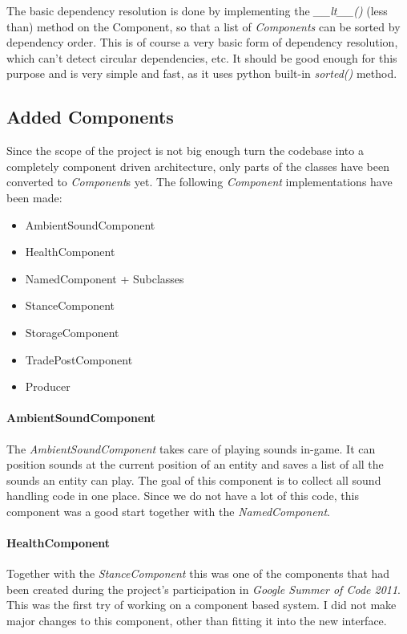 The basic dependency resolution is done by implementing the \textit{\_\_lt\_\_()} (less than) method on the Component,
so that a list of \textit{Components} can be sorted by dependency order. This is of course a very basic form of
dependency resolution, which can't detect circular dependencies, etc. It should be good enough for this purpose and is very
simple and fast, as it uses python built-in \textit{sorted()} method.


\subsection{Added Components}
Since the scope of the project is not big enough turn the \UH{} codebase into a completely component driven
architecture, only parts of the classes have been converted to \textit{Component}s yet. The following \textit{Component}
implementations have been made:
\begin{itemize}
    \item AmbientSoundComponent
    \item HealthComponent
    \item NamedComponent + Subclasses
    \item StanceComponent
    \item StorageComponent
    \item TradePostComponent
    \item Producer
\end{itemize}

\paragraph{AmbientSoundComponent}
The \textit{AmbientSoundComponent} takes care of playing sounds in-game. It can position sounds at the current position
of an entity and saves a list of all the sounds an entity can play. The goal of this component is to collect all sound
handling code in one place. Since we do not have a lot of this code, this component was a good start together with the
\textit{NamedComponent}.

\paragraph{HealthComponent}
Together with the \textit{StanceComponent} this was one of the components that had been created during the project's
participation in \textit{Google Summer of Code 2011}. This was the first try of working on a component based system. I
did not make major changes to this component, other than fitting it into the new interface.

